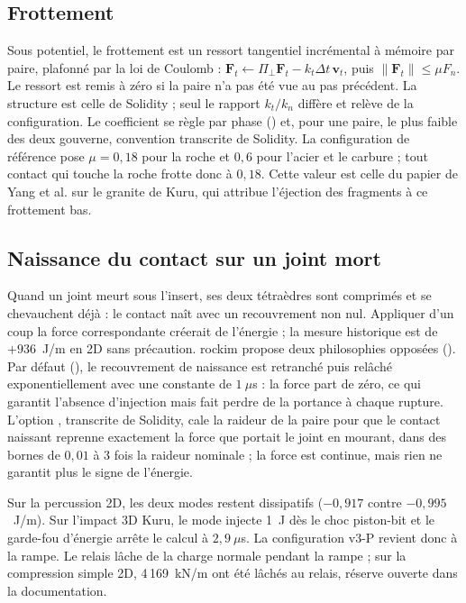 \subsection{Frottement}
\label{sec-frottement}

Sous potentiel, le frottement est un ressort tangentiel incrémental à mémoire par paire, plafonné par la loi de Coulomb : $\mathbf F_t \leftarrow \Pi_\perp \mathbf F_t - k_t \Delta t\, \mathbf v_t$, puis $\|\mathbf F_t\| \leq \mu F_n$. Le ressort est remis à zéro si la paire n'a pas été vue au pas précédent. La structure est celle de Solidity ; seul le rapport $k_t/k_n$ diffère et relève de la configuration. Le coefficient se règle par phase () et, pour une paire, le plus faible des deux gouverne, convention transcrite de Solidity. La configuration de référence pose $\mu = 0{,}18$ pour la roche et $0{,}6$ pour l'acier et le carbure ; tout contact qui touche la roche frotte donc à $0{,}18$. Cette valeur est celle du papier de Yang et al. sur le granite de Kuru, qui attribue l'éjection des fragments à ce frottement bas.

\subsection{Naissance du contact sur un joint mort}
\label{sec-naissance}

Quand un joint meurt sous l'insert, ses deux tétraèdres sont comprimés et se chevauchent déjà : le contact naît avec un recouvrement non nul. Appliquer d'un coup la force correspondante créerait de l'énergie ; la mesure historique est de $+936$~J/m en 2D sans précaution. rockim propose deux philosophies opposées (). Par défaut (), le recouvrement de naissance est retranché puis relâché exponentiellement avec une constante  de $1~\mu$s : la force part de zéro, ce qui garantit l'absence d'injection mais fait perdre de la portance à chaque rupture. L'option , transcrite de Solidity, cale la raideur de la paire pour que le contact naissant reprenne exactement la force que portait le joint en mourant, dans des bornes de $0{,}01$ à 3 fois la raideur nominale ; la force est continue, mais rien ne garantit plus le signe de l'énergie.

Sur la percussion 2D, les deux modes restent dissipatifs ($-0{,}917$ contre $-0{,}995$~J/m). Sur l'impact 3D Kuru, le mode  injecte 1~J dès le choc piston-bit et le garde-fou d'énergie arrête le calcul à $2{,}9~\mu$s. La configuration v3-P revient donc à la rampe. Le relais lâche de la charge normale pendant la rampe ; sur la compression simple 2D, 4\,169~kN/m ont été lâchés au relais, réserve ouverte dans la documentation.

